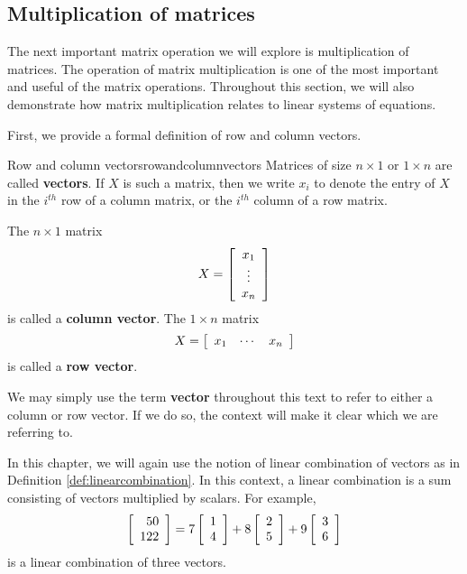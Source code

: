 \subsection{Multiplication of matrices}

The next important matrix operation we will explore is multiplication
of matrices. The
operation of matrix multiplication is one of the most important and
useful of the matrix operations.  Throughout this section, we will
also demonstrate how matrix multiplication relates to linear systems
of equations.

First, we provide a formal definition of row and column vectors. 

\begin{definition}{Row and column vectors}{rowandcolumnvectors}
Matrices of size $n\times 1$ or $1\times n$ are called \textbf{vectors}. If $X$ is such a matrix, then we write $x_{i}$ to 
denote the entry of $X$ in the $i^{th}$ row of a column matrix, or the $i^{th}$ column of a row matrix. 


The $n\times 1$ matrix
\begin{equation*}
X=\left[
\begin{array}{c}
x_{1} \\
\vdots \\
x_{n}
\end{array}
\right]
\end{equation*}
is called
a \textbf{column vector}.
The $1\times n$ matrix
\begin{equation*}
X = \left[
\begin{array}{ccc}
x_{1} & \cdots & x_{n}
\end{array}
\right]
\end{equation*}
is called a \textbf{row vector}.
\end{definition}

We may simply use the term \textbf{vector} throughout this text to refer to either a column or row vector. 
If we do so, the context will make it clear which we are referring to.

In this chapter, we will again use the notion of linear combination of
vectors as in  Definition \ref{def:linearcombination}.  In this context, a linear combination is a sum
consisting of vectors multiplied by scalars.  For example,
\begin{equation*}
\left[
\begin{array}{r}
50 \\
122
\end{array}
\right]
=
7\left[
\begin{array}{r}
1 \\
4
\end{array}
\right] +8\left[
\begin{array}{r}
2 \\
5
\end{array}
\right] +9\left[
\begin{array}{r}
3 \\
6
\end{array}
\right]
\end{equation*}
is a linear combination of three vectors. 

